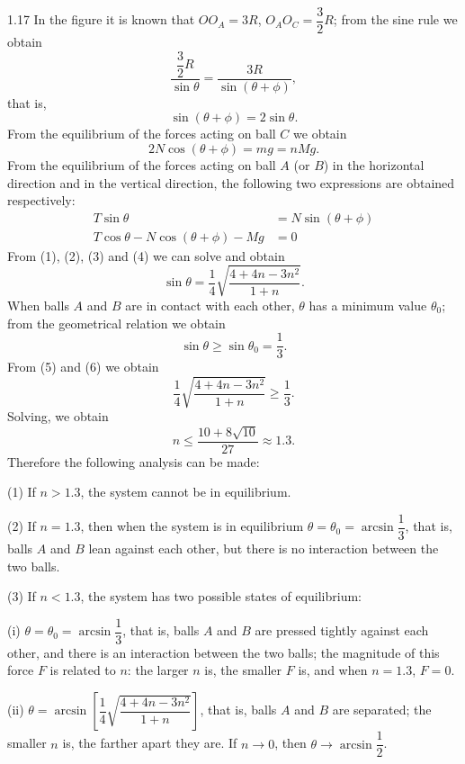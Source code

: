 \begin{solution}{1.17}
In the figure it is known that $OO_A=3R$, $O_AO_C=\dfrac{3}{2}R$; from the sine rule we obtain
\[
\frac{\dfrac{3}{2}R}{\sin\theta}=\frac{3R}{\sin(\theta+\phi)},
\]
that is,
\begin{equation}
\sin(\theta+\phi)=2\sin\theta. \tag{1}
\end{equation}
From the equilibrium of the forces acting on ball $C$ we obtain
\begin{equation}
2N\cos(\theta+\phi)=mg=nMg. \tag{2}
\end{equation}
From the equilibrium of the forces acting on ball $A$ (or $B$) in the horizontal direction and in the vertical direction, the following two expressions are obtained respectively:
\begin{align}
T\sin\theta&=N\sin(\theta+\phi) \tag{3}\\
T\cos\theta-N\cos(\theta+\phi)-Mg&=0 \tag{4}
\end{align}
From (1), (2), (3) and (4) we can solve and obtain
\begin{equation}
\sin\theta=\frac{1}{4}\sqrt{\frac{4+4n-3n^2}{1+n}}. \tag{5}
\end{equation}
When balls $A$ and $B$ are in contact with each other, $\theta$ has a minimum value $\theta_0$; from the geometrical relation we obtain
\begin{equation}
\sin\theta\geq\sin\theta_0=\frac{1}{3}. \tag{6}
\end{equation}
From (5) and (6) we obtain
\[
\frac{1}{4}\sqrt{\frac{4+4n-3n^2}{1+n}}\geq\frac{1}{3}.
\]
Solving, we obtain
\[
n\leq\frac{10+8\sqrt{10}}{27}\approx1.3.
\]
Therefore the following analysis can be made:

(1) If $n>1.3$, the system cannot be in equilibrium.

(2) If $n=1.3$, then when the system is in equilibrium $\theta=\theta_0=\arcsin\dfrac{1}{3}$, that is, balls $A$ and $B$ lean against each other, but there is no interaction between the two balls.

(3) If $n<1.3$, the system has two possible states of equilibrium:

(i) $\theta=\theta_0=\arcsin\dfrac{1}{3}$, that is, balls $A$ and $B$ are pressed tightly against each other, and there is an interaction between the two balls; the magnitude of this force $F$ is related to $n$: the larger $n$ is, the smaller $F$ is, and when $n=1.3$, $F=0$.

(ii) $\theta=\arcsin\left[\dfrac{1}{4}\sqrt{\dfrac{4+4n-3n^2}{1+n}}\right]$, that is, balls $A$ and $B$ are separated; the smaller $n$ is, the farther apart they are. If $n\to0$, then $\theta\to\arcsin\dfrac{1}{2}$.
\end{solution}

